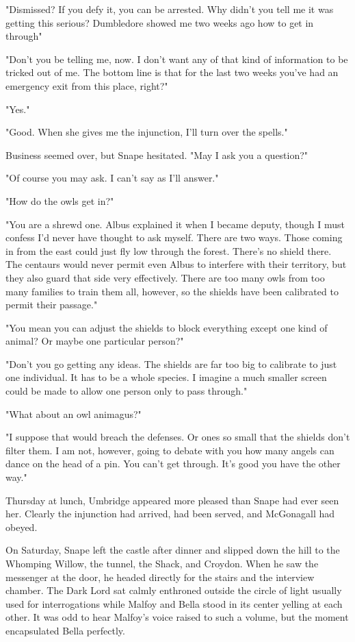 "Dismissed? If you defy it, you can be arrested. Why didn't you tell me it was getting this serious? Dumbledore showed me two weeks ago how to get in through{\el}"

"Don't you be telling me, now. I don't want any of that kind of information to be tricked out of me. The bottom line is that for the last two weeks you've had an emergency exit from this place, right?"

"Yes."

"Good. When she gives me the injunction, I'll turn over the spells."

Business seemed over, but Snape hesitated. "May I ask you a question?"

"Of course you may ask. I can't say as I'll answer."

"How do the owls get in?"

"You are a shrewd one. Albus explained it when I became deputy, though I must confess I'd never have thought to ask myself. There are two ways. Those coming in from the east could just fly low through the forest. There's no shield there. The centaurs would never permit even Albus to interfere with their territory, but they also guard that side very effectively. There are too many owls from too many families to train them all, however, so the shields have been calibrated to permit their passage."

"You mean you can adjust the shields to block everything except one kind of animal? Or maybe one particular person?"

"Don't you go getting any ideas. The shields are far too big to calibrate to just one individual. It has to be a whole species. I imagine a much smaller screen could be made to allow one person only to pass through."

"What about an owl animagus?"

"I suppose that would breach the defenses. Or ones so small that the shields don't filter them. I am not, however, going to debate with you how many angels can dance on the head of a pin. You can't get through. It's good you have the other way."

Thursday at lunch, Umbridge appeared more pleased than Snape had ever seen her. Clearly the injunction had arrived, had been served, and McGonagall had obeyed.

On Saturday, Snape left the castle after dinner and slipped down the hill to the Whomping Willow, the tunnel, the Shack, and Croydon. When he saw the messenger at the door, he headed directly for the stairs and the interview chamber. The Dark Lord sat calmly enthroned outside the circle of light usually used for interrogations while Malfoy and Bella stood in its center yelling at each other. It was odd to hear Malfoy's voice raised to such a volume, but the moment encapsulated Bella perfectly.

